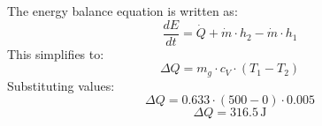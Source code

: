 The energy balance equation is written as:  
\[
\frac{dE}{dt} = \dot{Q} + \dot{m} \cdot h_2 - \dot{m} \cdot h_1
\]  
This simplifies to:  
\[
\Delta Q = m_g \cdot c_V \cdot (T_1 - T_2)
\]  
Substituting values:  
\[
\Delta Q = 0.633 \cdot (500 - 0) \cdot 0.005
\]  
\[
\Delta Q = 316.5 \, \text{J}
\]